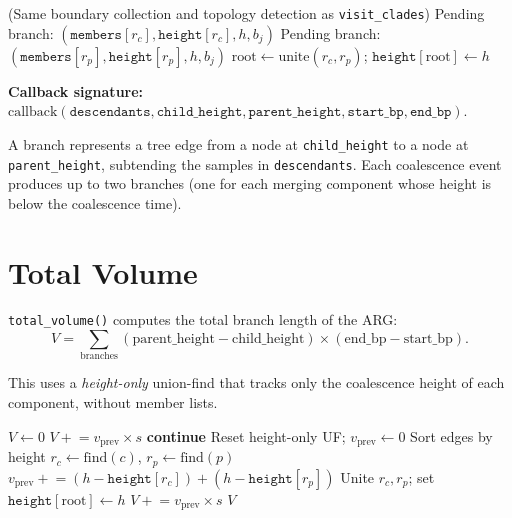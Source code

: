 \documentclass[11pt]{article}
\begin{document}
\begin{algorithm}[h]
\caption{\texttt{visit\_branches}: Enumerate all branches in the ARG}
\begin{algorithmic}[1]
\State (Same boundary collection and topology detection as \texttt{visit\_clades})
        \State Pending branch: $(\texttt{members}[r_c], \texttt{height}[r_c], h, b_j)$
    \EndIf
        \State Pending branch: $(\texttt{members}[r_p], \texttt{height}[r_p], h, b_j)$
    \EndIf
    \State $\text{root} \gets \text{unite}(r_c, r_p)$; $\texttt{height}[\text{root}] \gets h$
\EndFor
\end{algorithmic}
\end{algorithm}

\textbf{Callback signature:}
$\text{callback}(\texttt{descendants}, \texttt{child\_height},
\texttt{parent\_height}, \texttt{start\_bp}, \texttt{end\_bp})$.

A branch represents a tree edge from a node at \texttt{child\_height} to a
node at \texttt{parent\_height}, subtending the samples in
\texttt{descendants}.  Each coalescence event produces up to two branches
(one for each merging component whose height is below the coalescence
time).

\section{Total Volume}

\texttt{total\_volume()} computes the total branch length of the ARG:
\[
V = \sum_{\text{branches}} (\text{parent\_height} - \text{child\_height})
    \times (\text{end\_bp} - \text{start\_bp}).
\]

This uses a \emph{height-only} union-find that tracks only the coalescence
height of each component, without member lists.

\begin{algorithm}[h]
\caption{\texttt{total\_volume}: Total ARG branch volume}
\begin{algorithmic}[1]
\State $V \gets 0$
\For{each interval $[b_j, b_{j+1})$ with span $s = b_{j+1} - b_j$}
        \State $V \mathrel{+}= v_\text{prev} \times s$ 
        \State \textbf{continue}
    \EndIf
    \State Reset height-only UF; $v_\text{prev} \gets 0$
    \State Sort edges by height
        \State $r_c \gets \text{find}(c)$, $r_p \gets \text{find}(p)$
        \State $v_\text{prev} \mathrel{+}= (h - \texttt{height}[r_c]) + (h - \texttt{height}[r_p])$
        \State Unite $r_c, r_p$; set $\texttt{height}[\text{root}] \gets h$
    \EndFor
    \State $V \mathrel{+}= v_\text{prev} \times s$
\EndFor
\State \Return $V$
\end{algorithmic}
\end{algorithm}
\end{document}
